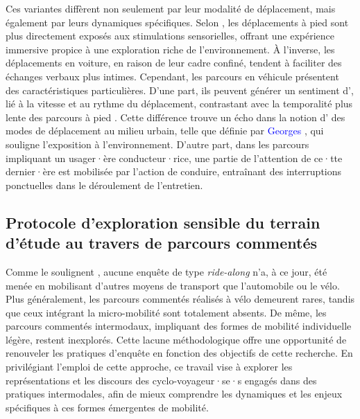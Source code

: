\begin{refsegment}
Ces variantes diffèrent non seulement par leur modalité de déplacement, mais également par leurs dynamiques spécifiques. Selon \textcolor{blue}{\textcite[120]{bergeron_uncovering_2014}}, les déplacements à pied sont plus directement exposés aux stimulations sensorielles, offrant une expérience immersive propice à une exploration riche de l’environnement. À l’inverse, les déplacements en voiture, en raison de leur cadre confiné, tendent à faciliter des échanges verbaux plus intimes. Cependant, les parcours en véhicule présentent des caractéristiques particulières. D’une part, ils peuvent générer un sentiment d’, lié à la vitesse et au rythme du déplacement, contrastant avec la temporalité plus lente des parcours à pied \textcolor{blue}{\autocite[12]{despres_replacer_2019}}. Cette différence trouve un écho dans la notion d’ des modes de déplacement au milieu urbain, telle que définie par \textcolor{blue}{Georges} \textcolor{blue}{\textcite[222]{amar_homo_2016}}, qui souligne l’exposition à l’environnement. D’autre part, dans les parcours impliquant un usager·ère conducteur·rice, une partie de l’attention de ce·tte dernier·ère est mobilisée par l’action de conduire, entraînant des interruptions ponctuelles dans le déroulement de l’entretien.%

\subsection{Protocole d'exploration sensible du terrain d’étude au travers de parcours commentés
    \label{chap3:parcours-commente-administration}
    }

Comme le soulignent \textcolor{blue}{\textcite[11]{despres_replacer_2019}}, aucune enquête de type \textsl{ride-along} n’a, à ce jour, été menée en mobilisant d’autres moyens de transport que l’automobile ou le vélo. Plus généralement, les parcours commentés réalisés à vélo demeurent rares, tandis que ceux intégrant la micro-mobilité sont totalement absents. De même, les parcours commentés intermodaux, impliquant des formes de mobilité individuelle légère, restent inexplorés. Cette lacune méthodologique offre une opportunité de renouveler les pratiques d’enquête en fonction des objectifs de cette recherche. En privilégiant l’emploi de cette approche, ce travail vise à explorer les représentations et les discours des cyclo-voyageur·se·s engagés dans des pratiques intermodales, afin de mieux comprendre les dynamiques et les enjeux spécifiques à ces formes émergentes de mobilité.%


\end{refsegment}
